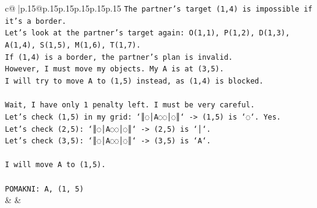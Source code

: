\documentclass{article}
\begin{document}
{\begin{supertabular}{c@{$\;$}|p{.15\linewidth}@{}p{.15\linewidth}p{.15\linewidth}p{.15\linewidth}p{.15\linewidth}p{.15\linewidth}}
{{{\texttt{The partner's target (1,4) is impossible if it's a border.} \\
\texttt{Let's look at the partner's target again: O(1,1), P(1,2), D(1,3), A(1,4), S(1,5), M(1,6), T(1,7).} \\
\texttt{If (1,4) is a border, the partner's plan is invalid.} \\
\texttt{However, I must move my objects. My A is at (3,5).} \\
\texttt{I will try to move A to (1,5) instead, as (1,4) is blocked.} \\
\\ 
\texttt{Wait, I have only 1 penalty left. I must be very careful.} \\
\texttt{Let's check (1,5) in my grid: `║◌│A◌◌│◌║` {-}> (1,5) is `◌`. Yes.} \\
\texttt{Let's check (2,5): `║◌│A◌◌│◌║` {-}> (2,5) is `│`.} \\
\texttt{Let's check (3,5): `║◌│A◌◌│◌║` {-}> (3,5) is `A`.} \\
\\ 
\texttt{I will move A to (1,5).} \\
\\ 
\texttt{POMAKNI: A, (1, 5)} \\
            }
        }
    }
    & & \\ \\


\end{supertabular}}
\end{document}
